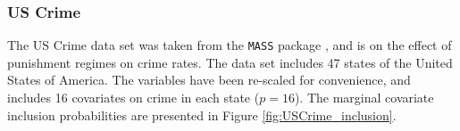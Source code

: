 \documentclass{amsart}[12pt]
\begin{document}






\subsubsection{US Crime}

The US Crime data set was taken from the \texttt{MASS} package \citep{Venables2002}, and is on the effect of
punishment regimes on crime rates. The data set includes 47 states of the United States of America. The
variables have been re-scaled for convenience, and includes 16 covariates on crime in each state ($p=16$). The
marginal covariate inclusion probabilities are presented in Figure \ref{fig:USCrime_inclusion}.

\end{document}
